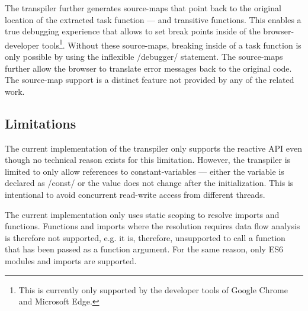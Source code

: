 The transpiler further generates source-maps that point back to the original location of the extracted task function --- and transitive functions. This enables a true debugging experience that allows to set break points inside of the browser-developer tools\footnote{This is currently only supported by the developer tools of Google Chrome and Microsoft Edge.}. Without these source-maps, breaking inside of a task function is only possible by using the inflexible \javascriptinline/debugger/ statement. The source-maps further allow the browser to translate error messages back to the original code. The source-map support is a distinct feature not provided by any of the related work.

\subsection{Limitations}
The current implementation of the transpiler only supports the reactive API even though no technical reason exists for this limitation. However, the transpiler is limited to only allow references to constant-variables --- either the variable is declared as \javascriptinline/const/ or the value does not change after the initialization. This is intentional to avoid concurrent read-write access from different threads. 

The current implementation only uses static scoping to resolve imports and functions. Functions and imports where the resolution requires data flow analysis is therefore not supported, e.g. it is, therefore, unsupported to call a function that has been passed as a function argument. For the same reason, only ES6 modules and imports are supported.
